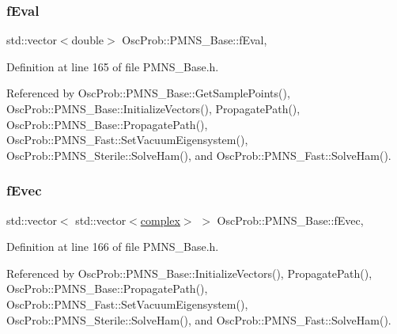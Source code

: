\subsubsection{\texorpdfstring{f\+Eval}{fEval}}
{\footnotesize\ttfamily std\+::vector$<$double$>$ Osc\+Prob\+::\+P\+M\+N\+S\+\_\+\+Base\+::f\+Eval\hspace{0.3cm}{\ttfamily [protected]}, {\ttfamily [inherited]}}



Definition at line 165 of file P\+M\+N\+S\+\_\+\+Base.\+h.



Referenced by Osc\+Prob\+::\+P\+M\+N\+S\+\_\+\+Base\+::\+Get\+Sample\+Points(), Osc\+Prob\+::\+P\+M\+N\+S\+\_\+\+Base\+::\+Initialize\+Vectors(), Propagate\+Path(), Osc\+Prob\+::\+P\+M\+N\+S\+\_\+\+Base\+::\+Propagate\+Path(), Osc\+Prob\+::\+P\+M\+N\+S\+\_\+\+Fast\+::\+Set\+Vacuum\+Eigensystem(), Osc\+Prob\+::\+P\+M\+N\+S\+\_\+\+Sterile\+::\+Solve\+Ham(), and Osc\+Prob\+::\+P\+M\+N\+S\+\_\+\+Fast\+::\+Solve\+Ham().

\mbox{\label{classOscProb_1_1PMNS__Base_a093e7bd31d4ef52ed52df414e12c1d17}} 
\subsubsection{\texorpdfstring{f\+Evec}{fEvec}}
{\footnotesize\ttfamily std\+::vector$<$ std\+::vector$<$\hyperlink{classOscProb_1_1PMNS__Base_ae86ec4718808ce9d02e5f5b4226714ab}{complex}$>$ $>$ Osc\+Prob\+::\+P\+M\+N\+S\+\_\+\+Base\+::f\+Evec\hspace{0.3cm}{\ttfamily [protected]}, {\ttfamily [inherited]}}



Definition at line 166 of file P\+M\+N\+S\+\_\+\+Base.\+h.



Referenced by Osc\+Prob\+::\+P\+M\+N\+S\+\_\+\+Base\+::\+Initialize\+Vectors(), Propagate\+Path(), Osc\+Prob\+::\+P\+M\+N\+S\+\_\+\+Base\+::\+Propagate\+Path(), Osc\+Prob\+::\+P\+M\+N\+S\+\_\+\+Fast\+::\+Set\+Vacuum\+Eigensystem(), Osc\+Prob\+::\+P\+M\+N\+S\+\_\+\+Sterile\+::\+Solve\+Ham(), and Osc\+Prob\+::\+P\+M\+N\+S\+\_\+\+Fast\+::\+Solve\+Ham().

\mbox{\label{classOscProb_1_1PMNS__Deco_ae2f30ac9f8b25344959f1698616d337a}} 
